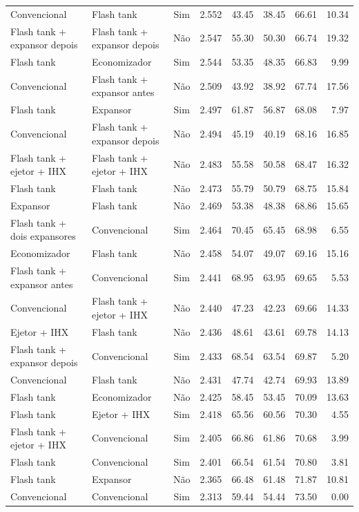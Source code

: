 {\begin{tabular}{llcrrrrr}
Convencional & Flash tank & Sim & 2.552 & 43.45 & 38.45 & 66.61 & 10.34 \\
Flash tank + expansor depois & Flash tank + expansor depois & Não & 2.547 & 55.30 & 50.30 & 66.74 & 19.32 \\
Flash tank & Economizador & Sim & 2.544 & 53.35 & 48.35 & 66.83 & 9.99 \\
Convencional & Flash tank + expansor antes & Não & 2.509 & 43.92 & 38.92 & 67.74 & 17.56 \\
Flash tank & Expansor & Sim & 2.497 & 61.87 & 56.87 & 68.08 & 7.97 \\
Convencional & Flash tank + expansor depois & Não & 2.494 & 45.19 & 40.19 & 68.16 & 16.85 \\
Flash tank + ejetor + IHX & Flash tank + ejetor + IHX & Não & 2.483 & 55.58 & 50.58 & 68.47 & 16.32 \\
Flash tank & Flash tank & Não & 2.473 & 55.79 & 50.79 & 68.75 & 15.84 \\
Expansor & Flash tank & Não & 2.469 & 53.38 & 48.38 & 68.86 & 15.65 \\
Flash tank + dois expansores & Convencional & Sim & 2.464 & 70.45 & 65.45 & 68.98 & 6.55 \\
Economizador & Flash tank & Não & 2.458 & 54.07 & 49.07 & 69.16 & 15.16 \\
Flash tank + expansor antes & Convencional & Sim & 2.441 & 68.95 & 63.95 & 69.65 & 5.53 \\
Convencional & Flash tank + ejetor + IHX & Não & 2.440 & 47.23 & 42.23 & 69.66 & 14.33 \\
Ejetor + IHX & Flash tank & Não & 2.436 & 48.61 & 43.61 & 69.78 & 14.13 \\
Flash tank + expansor depois & Convencional & Sim & 2.433 & 68.54 & 63.54 & 69.87 & 5.20 \\
Convencional & Flash tank & Não & 2.431 & 47.74 & 42.74 & 69.93 & 13.89 \\
Flash tank & Economizador & Não & 2.425 & 58.45 & 53.45 & 70.09 & 13.63 \\
Flash tank & Ejetor + IHX & Sim & 2.418 & 65.56 & 60.56 & 70.30 & 4.55 \\
Flash tank + ejetor + IHX & Convencional & Sim & 2.405 & 66.86 & 61.86 & 70.68 & 3.99 \\
Flash tank & Convencional & Sim & 2.401 & 66.54 & 61.54 & 70.80 & 3.81 \\
Flash tank & Expansor & Não & 2.365 & 66.48 & 61.48 & 71.87 & 10.81 \\
Convencional & Convencional & Sim & 2.313 & 59.44 & 54.44 & 73.50 & 0.00 \\

\end{tabular}}
